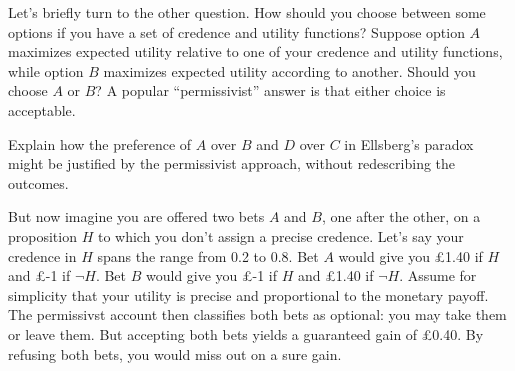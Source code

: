Let's briefly turn to the other question. How should you choose between some
options if you have a set of credence and utility functions? Suppose option $A$
maximizes expected utility relative to one of your credence and utility
functions, while option $B$ maximizes expected utility according to another.
Should you choose $A$ or $B$? A popular ``permissivist'' answer is that either
choice is acceptable.

\begin{exercise}{2}
  Explain how the preference of $A$ over $B$ and $D$ over $C$ in Ellsberg's
  paradox might be justified by the permissivist approach, without redescribing
  the outcomes.
\end{exercise}

But now imagine you are offered two bets $A$ and $B$, one after the other, on a
proposition $H$ to which you don't assign a precise credence. Let's say your
credence in $H$ spans the range from 0.2 to 0.8. Bet $A$ would give you
£1.40 if $H$ and £-1 if $\neg H$. Bet $B$ would give you £-1 if $H$ and £1.40 if
$\neg H$. Assume for simplicity that your utility is precise and proportional to
the monetary payoff. The permissivst account then classifies both bets as
optional: you may take them or leave them. But accepting both bets yields a
guaranteed gain of £0.40. By refusing both bets, you would miss out on a sure
gain.



